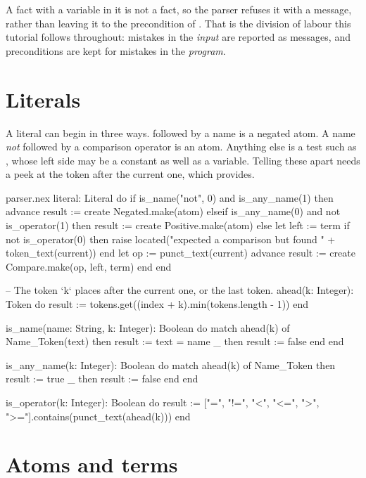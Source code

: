 A fact with a variable in it is not a fact, so the parser refuses it with
a message, rather than leaving it to the precondition of .
That is the division of labour this tutorial follows throughout: mistakes
in the \emph{input} are reported as messages, and preconditions are kept
for mistakes in the \emph{program}.

\section{Literals}

A literal can begin in three ways.  followed by a name is a
negated atom. A name \emph{not} followed by a comparison operator is an
atom. Anything else is a test such as , whose left side may be
a constant as well as a variable. Telling these apart needs a peek at the
token after the current one, which  provides.

\begin{continued}{parser.nex}
  literal: Literal
  do
    if is_name("not", 0) and is_any_name(1) then
      advance
      result := create Negated.make(atom)
    elseif is_any_name(0) and not is_operator(1) then
      result := create Positive.make(atom)
    else
      let left := term
      if not is_operator(0) then
        raise located("expected a comparison but found " + token_text(current))
      end
      let op := punct_text(current)
      advance
      result := create Compare.make(op, left, term)
    end
  end

  -- The token `k` places after the current one, or the last token.
  ahead(k: Integer): Token
  do
    result := tokens.get((index + k).min(tokens.length - 1))
  end

  is_name(name: String, k: Integer): Boolean
  do
    match ahead(k) of
      Name_Token(text) then result := text = name
      _                then result := false
    end
  end

  is_any_name(k: Integer): Boolean
  do
    match ahead(k) of
      Name_Token then result := true
      _          then result := false
    end
  end

  is_operator(k: Integer): Boolean
  do
    result := ["=", "!=", "<", "<=", ">", ">="].contains(punct_text(ahead(k)))
  end
\end{continued}

\section{Atoms and terms}

